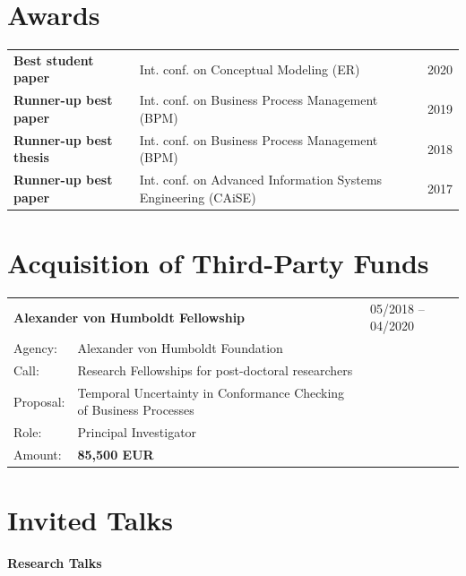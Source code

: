 \section{Awards}
\begin{tabular}{lll  }
	\normalsize \textbf{Best student paper} &
	Int. conf. on Conceptual Modeling (ER) & 2020 \\
	
	\normalsize \textbf{Runner-up best paper} &
	Int. conf.  on Business Process Management (BPM) & 2019 \\
	\normalsize \textbf{Runner-up best thesis} &
	Int. conf. on Business Process Management (BPM) & 2018\\
	\normalsize \textbf{Runner-up best paper} & 
	Int. conf.  on Advanced Information Systems Engineering (CAiSE) & 2017\\
	
\end{tabular}

\medskip 

\section{Acquisition of Third-Party Funds}
\begin{tabular}{p{1.3cm}p{10.8cm}l}
	\multicolumn{2}{l}{\normalsize \textbf{Alexander von Humboldt Fellowship}} & 05/2018 -- 04/2020\\
	Agency: &Alexander von Humboldt Foundation \\
	Call: & Research Fellowships for post-doctoral researchers \\
	Proposal: & Temporal Uncertainty in Conformance Checking of Business Processes \\
	Role: & Principal Investigator  \\
	Amount: & \small\textbf{85,500 EUR} \\
	
\end{tabular}



\medskip
\section{Invited Talks }

	\textbf{Research Talks}
	\smallskip
	
